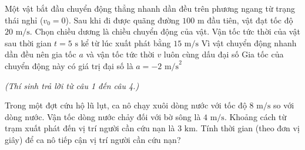 \begin{ex}
	Một vật bắt đầu chuyển động thẳng nhanh dần đều trên phương ngang từ trạng thái nghỉ ($v_0 = 0$). Sau khi đi được quãng đường $100\text{ m}$ đầu tiên, vật đạt tốc độ $20\text{ m/s}$. Chọn chiều dương là chiều chuyển động của vật.
	{Vận tốc tức thời của vật sau thời gian $t = 5\text{ s}$ kể từ lúc xuất phát bằng $15\text{ m/s}$}
	{\True Vì vật chuyển động nhanh dần đều nên gia tốc $a$ và vận tốc tức thời $v$ luôn cùng dấu đại số}
	{Gia tốc của chuyển động này có giá trị đại số là $a = -2\text{ m/s}^2$}
\end{ex}

\vspace{0.15cm}
\begin{flushleft}
	{\color{blue!50!green}}
	\textit{\small (Thí sinh trả lời từ câu 1 đến câu 4.)}
\end{flushleft}
\setcounter{ex}{0}
\setcounter{bt}{0}

\begin{ex}
	Trong một đợt cứu hộ lũ lụt, ca nô chạy xuôi dòng nước với tốc độ $8\text{ m/s}$ so với dòng nước. Vận tốc dòng nước chảy đối với bờ sông là $4\text{ m/s}$. Khoảng cách từ trạm xuất phát đến vị trí người cần cứu nạn là $3\text{ km}$. Tính thời gian (theo đơn vị giây) để ca nô tiếp cận vị trí người cần cứu nạn?

	\par{}
\end{ex}

